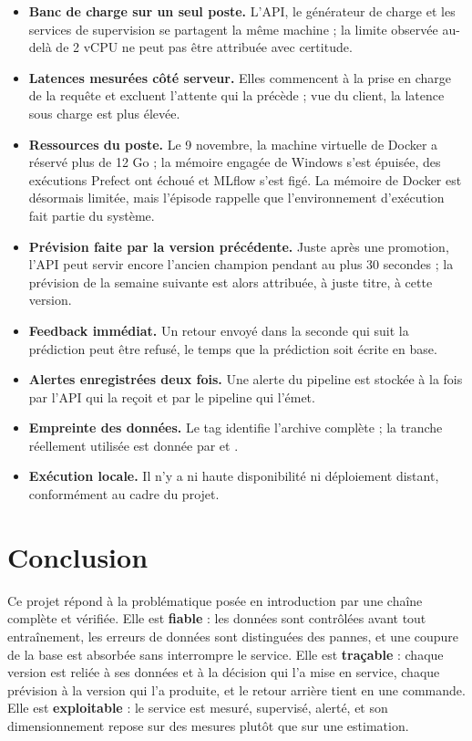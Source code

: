 \documentclass[11pt,a4paper]{article}
\newcommand{\code}[1]{\texttt{\detokenize{#1}}}
\begin{document}
\begin{itemize}
  \item \textbf{Banc de charge sur un seul poste.} L'API, le générateur de charge et les
        services de supervision se partagent la même machine ; la limite observée au-delà
        de 2 vCPU ne peut pas être attribuée avec certitude.
  \item \textbf{Latences mesurées côté serveur.} Elles commencent à la prise en charge de la
        requête et excluent l'attente qui la précède ; vue du client, la latence sous charge
        est plus élevée.
  \item \textbf{Ressources du poste.} Le 9 novembre, la machine virtuelle de Docker a réservé
        plus de 12 Go ; la mémoire engagée de Windows s'est épuisée, des exécutions Prefect
        ont échoué et MLflow s'est figé. La mémoire de Docker est désormais limitée, mais
        l'épisode rappelle que l'environnement d'exécution fait partie du système.
  \item \textbf{Prévision faite par la version précédente.} Juste après une promotion, l'API
        peut servir encore l'ancien champion pendant au plus 30 secondes ; la prévision de
        la semaine suivante est alors attribuée, à juste titre, à cette version.
  \item \textbf{Feedback immédiat.} Un retour envoyé dans la seconde qui suit la prédiction
        peut être refusé, le temps que la prédiction soit écrite en base.
  \item \textbf{Alertes enregistrées deux fois.} Une alerte du pipeline est stockée à la fois
        par l'API qui la reçoit et par le pipeline qui l'émet.
  \item \textbf{Empreinte des données.} Le tag \code{data_hash} identifie l'archive complète ;
        la tranche réellement utilisée est donnée par \code{until_week} et
        \code{features_hash}.
  \item \textbf{Exécution locale.} Il n'y a ni haute disponibilité ni déploiement distant,
        conformément au cadre du projet.
\end{itemize}

\section{Conclusion}

Ce projet répond à la problématique posée en introduction par une chaîne complète et
vérifiée. Elle est \textbf{fiable} : les données sont contrôlées avant tout entraînement, les
erreurs de données sont distinguées des pannes, et une coupure de la base est absorbée sans
interrompre le service. Elle est \textbf{traçable} : chaque version est reliée à ses données
et à la décision qui l'a mise en service, chaque prévision à la version qui l'a produite, et
le retour arrière tient en une commande. Elle est \textbf{exploitable} : le service est
mesuré, supervisé, alerté, et son dimensionnement repose sur des mesures plutôt que sur une
estimation.
\end{document}
